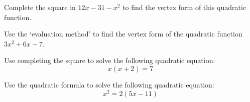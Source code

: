 \documentclass[11pt,letterpaper]{article}
\begin{document}

 Complete the square in $12x - 31 - x^2$ to find the vertex form of this quadratic function. 



\newpage



 Use the `evaluation method' to find the vertex form of the quadratic function $3x^2 + 6x - 7$. 



\newpage



 Use completing the square to solve the following quadratic equation: 
	\[
	x(x + 2)= 7
	\]



\newpage



 Use the quadratic formula to solve the following quadratic equation:
	\[
	x^2= 2(5x - 11)
	\]
\end{document}
